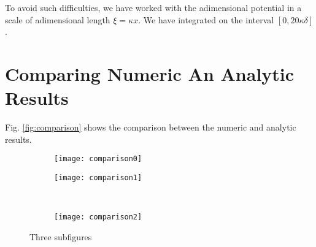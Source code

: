 To avoid such difficulties, we have worked with the adimensional potential in a scale of adimensional length $\xi = \kappa x$. We have integrated on the interval $[0, 20 \kappa \delta]$.



\newpage

\section*{Comparing Numeric An Analytic Results}

Fig. \ref{fig:comparison} shows the comparison between the numeric and analytic results. 



\begin{figure}[htbp]
\begin{subfigure}{.5\linewidth}
\centering
\texttt{[image: comparison0]}
\caption{}
\label{fig:sub1}
\end{subfigure}%
\begin{subfigure}{.5\linewidth}
\centering
\texttt{[image: comparison1]}
\caption{}
\label{fig:sub2}
\end{subfigure}\\[1ex]
\begin{subfigure}{\linewidth}
\centering
\texttt{[image: comparison2]}
\caption{}
\label{fig:sub3}
\end{subfigure}
\caption{Three subfigures}
\label{fig:test}
\end{figure}






